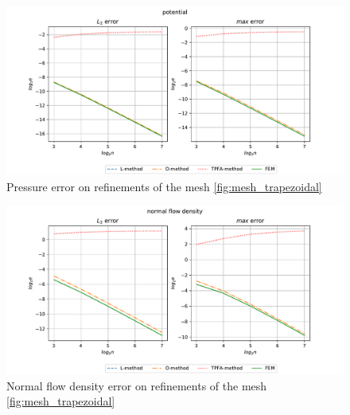 \documentclass[../Main/main.tex]{subfiles}
\begin{document}
	\begin{figure}[H]
		\advance\leftskip-1cm
		\includegraphics[width=1.2\textwidth]{pressure_trapezoidal_1d1.pdf}
		\caption{Pressure error on refinements of the mesh \ref{fig:mesh_trapezoidal}}
		\label{fig:mesh_trapezoidal_potential}
	\end{figure}
	\begin{figure}[H]
		\advance\leftskip-1cm
		\includegraphics[width=1.2\textwidth]{flow_trapezoidal_1d1.pdf}
		\caption{Normal flow density error on refinements of the mesh \ref{fig:mesh_trapezoidal}}
		\label{fig:mesh_trapezoidal_flow}
	\end{figure}
	
\end{document}

